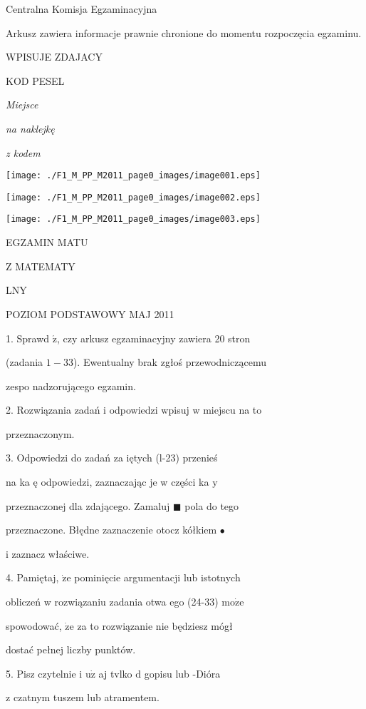 \documentclass[a4paper,12pt]{article}
\begin{document}
Centralna Komisja Egzaminacyjna

Arkusz zawiera informacje prawnie chronione do momentu rozpoczęcia egzaminu.

WPISUJE ZDAJACY

KOD PESEL

{\it Miejsce}

{\it na naklejkę}

{\it z kodem}
\begin{center}
\texttt{[image: ./F1\_M\_PP\_M2011\_page0\_images/image001.eps]}

\texttt{[image: ./F1\_M\_PP\_M2011\_page0\_images/image002.eps]}

\texttt{[image: ./F1\_M\_PP\_M2011\_page0\_images/image003.eps]}
\end{center}
EGZAMIN MATU

Z MATEMATY

LNY

POZIOM PODSTAWOWY  MAJ 2011

1. Sprawd $\acute{\mathrm{z}}$, czy arkusz egzaminacyjny zawiera 20 stron

(zadania $1-33$). Ewentualny brak zgłoś przewodniczącemu

zespo nadzorującego egzamin.

2. Rozwiązania zadań i odpowiedzi wpisuj w miejscu na to

przeznaczonym.

3. Odpowiedzi do zadań za iętych (l-23) przenieś

na ka ę odpowiedzi, zaznaczając je w części ka $\mathrm{y}$

przeznaczonej dla zdającego. Zamaluj $\blacksquare$ pola do tego

przeznaczone. Błędne zaznaczenie otocz kółkiem \fcircle$\bullet$

i zaznacz właściwe.

4. Pamiętaj, $\dot{\mathrm{z}}\mathrm{e}$ pominięcie argumentacji lub istotnych

obliczeń w rozwiązaniu zadania otwa ego (24-33) $\mathrm{m}\mathrm{o}\dot{\mathrm{z}}\mathrm{e}$

spowodować, $\dot{\mathrm{z}}\mathrm{e}$ za to rozwiązanie nie będziesz mógł

dostać pełnej liczby punktów.

5. Pisz czytelnie i $\mathrm{u}\dot{\mathrm{z}}$ aj tvlko $\mathrm{d}$ gopisu lub -Dióra

z czatnym tuszem lub atramentem.
\end{document}
